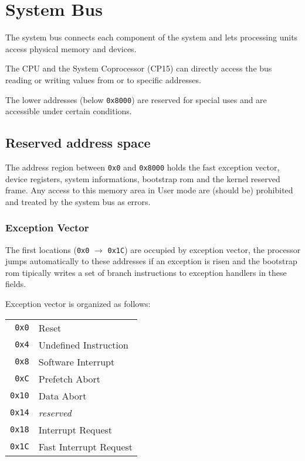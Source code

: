 \chapter{System Bus}

The system bus connects each component of the system and lets processing units access physical memory and devices.

The CPU and the System Coprocessor (CP15) can directly access the bus reading or writing values from or to specific addresses.

The lower addresses (below \texttt{0x8000}) are reserved for special uses and are accessible under certain conditions.

\section{Reserved address space}
The address region between \texttt{0x0} and \texttt{0x8000} holds the fast exception vector, device registers, system informations, bootstrap rom and the kernel reserved frame. Any access to this memory area in User mode are (should be) prohibited and treated by the system bus as errors.

\subsection{Exception Vector}
The first locations (\texttt{0x0} $\rightarrow$ \texttt{0x1C}) are occupied by exception vector, the processor jumps automatically to these addresses if an exception is risen and the bootstrap rom tipically writes a set of branch instructions to exception handlers in these fields.

Exception vector is organized as follows:
\\

\begin{tabular}{r|l}
\texttt{0x0} & Reset \\
\texttt{0x4} & Undefined Instruction \\
\texttt{0x8} & Software Interrupt \\
\texttt{0xC} & Prefetch Abort \\
\texttt{0x10} & Data Abort \\
\texttt{0x14} & \emph{reserved} \\
\texttt{0x18} & Interrupt Request \\
\texttt{0x1C} & Fast Interrupt Request \\
\end{tabular}

